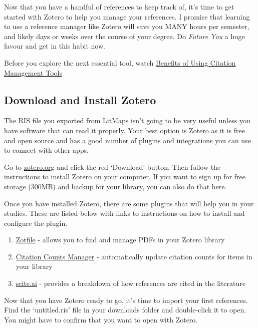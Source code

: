 \documentclass[
]{book}
\providecommand{\tightlist}{%
  \setlength{\itemsep}{0pt}\setlength{\parskip}{0pt}}
\theoremstyle{definition}
\theoremstyle{definition}
\theoremstyle{definition}
\theoremstyle{definition}
\theoremstyle{remark}
\begin{document}
Now that you have a handful of references to keep track of, it's time to get started with Zotero to help you manage your references. I promise that learning to use a reference manager like Zotero will save you MANY hours per semester, and likely days or weeks over the course of your degree. Do \emph{Future You} a huge favour and get in this habit now.

Before you explore the next essential tool, watch \href{https://www.youtube.com/watch?v=sy9PVZAbSAQ}{Benefits of Using Citation Management Tools}

\hypertarget{download-and-install-zotero}{%
\subsection*{Download and Install Zotero}\label{download-and-install-zotero}}

The RIS file you exported from LitMaps isn't going to be very useful unless you have software that can read it properly. Your best option is Zotero as it is free and open source and has a good number of plugins and integrations you can use to connect with other apps.

Go to \href{https://zotero.org}{zotero.org} and click the red `Download' button. Then follow the instructions to install Zotero on your computer. If you want to sign up for free storage (300MB) and backup for your library, you can also do that here.

Once you have installed Zotero, there are some plugins that will help you in your studies. These are listed below with links to instructions on how to install and configure the plugin.

\begin{enumerate}
\def\labelenumi{\arabic{enumi}.}
\tightlist
\item
  \href{http://zotfile.com/\#how-to-install--set-up-zotfile}{Zotfile} - allows you to find and manage PDFs in your Zotero library
\item
  \href{https://github.com/eschnett/zotero-citationcounts\#installing}{Citation Counts Manager} - automatically update citation counts for items in your library
\item
  \href{https://github.com/scitedotai/scite-zotero-plugin\#installation}{scite.ai} - provides a breakdown of how references are cited in the literature
\end{enumerate}

Now that you have Zotero ready to go, it's time to import your first references. Find the `untitled.ris' file in your downloads folder and double-click it to open. You might have to confirm that you want to open with Zotero.
\end{document}

